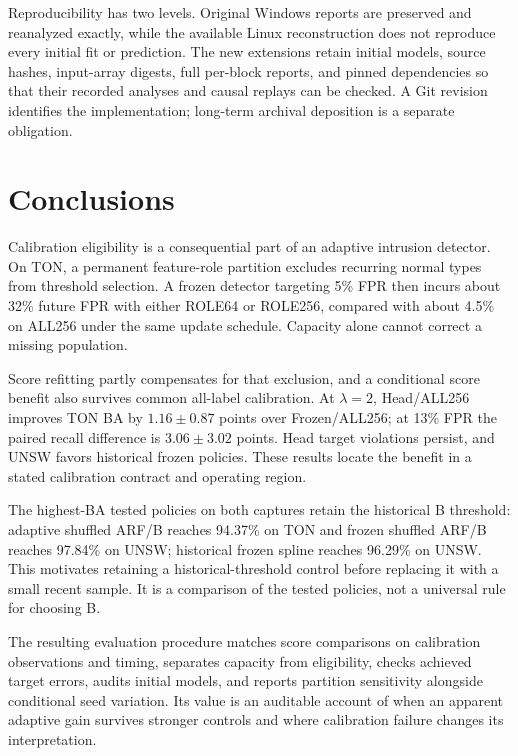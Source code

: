 Reproducibility has two levels. Original Windows reports are preserved and reanalyzed exactly, while the available Linux reconstruction does not reproduce every initial fit or prediction. The new extensions retain initial models, source hashes, input-array digests, full per-block reports, and pinned dependencies so that their recorded analyses and causal replays can be checked. A Git revision identifies the implementation; long-term archival deposition is a separate obligation.

\section{Conclusions}
Calibration eligibility is a consequential part of an adaptive intrusion detector. On TON, a permanent feature-role partition excludes recurring normal types from threshold selection. A frozen detector targeting 5\% FPR then incurs about 32\% future FPR with either ROLE64 or ROLE256, compared with about 4.5\% on ALL256 under the same update schedule. Capacity alone cannot correct a missing population.

Score refitting partly compensates for that exclusion, and a conditional score benefit also survives common all-label calibration. At $\lambda=2$, Head/ALL256 improves TON BA by $1.16\pm0.87$ points over Frozen/ALL256; at 13\% FPR the paired recall difference is $3.06\pm3.02$ points. Head target violations persist, and UNSW favors historical frozen policies. These results locate the benefit in a stated calibration contract and operating region.

The highest-BA tested policies on both captures retain the historical B threshold: adaptive shuffled ARF/B reaches 94.37\% on TON and frozen shuffled ARF/B reaches 97.84\% on UNSW; historical frozen spline reaches 96.29\% on UNSW. This motivates retaining a historical-threshold control before replacing it with a small recent sample. It is a comparison of the tested policies, not a universal rule for choosing B.

The resulting evaluation procedure matches score comparisons on calibration observations and timing, separates capacity from eligibility, checks achieved target errors, audits initial models, and reports partition sensitivity alongside conditional seed variation. Its value is an auditable account of when an apparent adaptive gain survives stronger controls and where calibration failure changes its interpretation.

